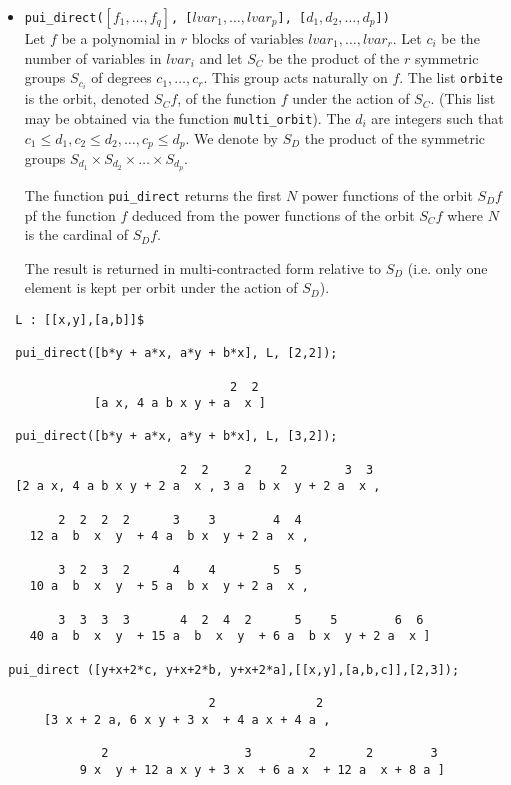 \documentclass[11pt]{article}
\begin{document}
\normalsize
\begin{itemize}
  \item\texttt{pui\_direct($[f_1,\ldots,f_q]$, [$lvar_1,\ldots,lvar_p$],
    [$d_1,d_2,\ldots,d_p$])} \\ 
    Let $f$ be a polynomial in $r$ blocks of variables $lvar_1,\ldots,lvar_r$.
    Let $c_i$ be the number of variables in $lvar_i$ and let $S_C$ be the product
    of the $r$ symmetric groups $S_{c_i}$ of degrees $c_1,\dots,c_r$.  This group
    acts naturally on $f$.  The list \texttt{orbite} is the orbit, denoted $S_Cf$,
    of the function $f$ under the action of $S_C$.  (This list may be obtained via
    the function \texttt{multi\_orbit}).  The $d_i$ are integers such that
    $c_1\leq d_1, c_2 \leq d_2,\ldots, c_p\leq d_p$.  We denote by $S_D$ the
    product of the symmetric groups $S_{d_1} \times S_{d_2} \times \ldots \times
    S_{d_p}$.

    The function \texttt{pui\_direct} returns the first $N$ power functions of
    the orbit $S_Df$ pf the function $f$ deduced from the power functions of the
    orbit $S_Cf$ where $N$ is the cardinal of $S_Df$.

    The result is returned in multi-contracted form relative to $S_D$ (i.e. only
    one element is kept per orbit under the action of $S_D$).
\end{itemize}
\small
\begin{verbatim}
  L : [[x,y],[a,b]]$

  pui_direct([b*y + a*x, a*y + b*x], L, [2,2]);

                                2  2
             [a x, 4 a b x y + a  x ]

  pui_direct([b*y + a*x, a*y + b*x], L, [3,2]);

                         2  2     2    2        3  3
  [2 a x, 4 a b x y + 2 a  x , 3 a  b x  y + 2 a  x ,

        2  2  2  2      3    3        4  4
    12 a  b  x  y  + 4 a  b x  y + 2 a  x ,

        3  2  3  2      4    4        5  5
    10 a  b  x  y  + 5 a  b x  y + 2 a  x ,

        3  3  3  3       4  2  4  2      5    5        6  6
    40 a  b  x  y  + 15 a  b  x  y  + 6 a  b x  y + 2 a  x ]

 pui_direct ([y+x+2*c, y+x+2*b, y+x+2*a],[[x,y],[a,b,c]],[2,3]);

                             2              2
      [3 x + 2 a, 6 x y + 3 x  + 4 a x + 4 a , 

              2                   3        2       2        3
           9 x  y + 12 a x y + 3 x  + 6 a x  + 12 a  x + 8 a ]
\end{verbatim}
\end{document}
